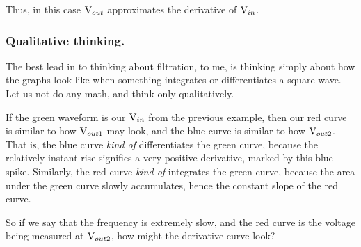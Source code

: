 \documentclass[12pt]{report}
\newcommand{\V}{{\rm V}}
\begin{document}
Thus, in this case $\V_{out}$ approximates the derivative of $\V_{in}$. 

\subsubsection{Qualitative thinking.}

The best lead in to thinking about filtration, to me, is thinking simply about how the graphs look like when something integrates or differentiates a square wave. Let us not do any math, and think only qualitatively. 

\begin{centering}
    
\end{centering}

If the green waveform is our $\V_{in}$ from the previous example, then our red curve is similar to how $\V_{out1}$ may look, and the blue curve is similar to how $\V_{out2}$. That is, the blue curve \textit{kind of} differentiates the green curve, because the relatively instant rise signifies a very positive derivative, marked by this blue spike. Similarly, the red curve \textit{kind of} integrates the green curve, because the area under the green curve slowly accumulates, hence the constant slope of the red curve.\newline 

So if we say that the frequency is extremely slow, and the red curve is the voltage being measured at $\V_{out2}$, how might the derivative curve look? 
\end{document}
